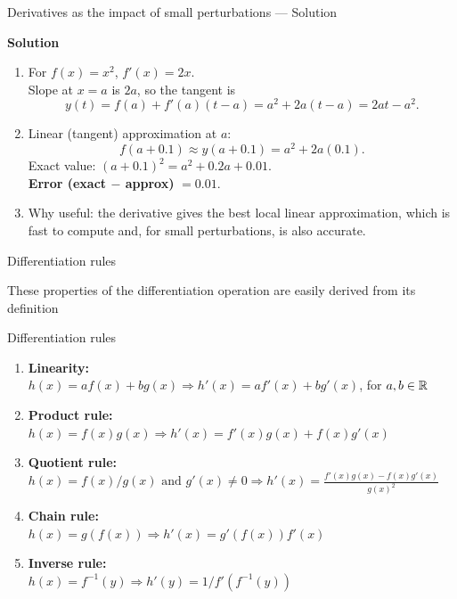 \documentclass[9pt]{beamer}
\begin{document}
\begin{frame}{Derivatives as the impact of small perturbations — Solution}

\textbf{Solution}
\begin{enumerate}[leftmargin=0.8cm, label=(\alph*), rightmargin=0.2cm]

\item For $f(x)=x^2$, $f'(x)=2x$. \\
Slope at $x=a$ is $2a$, so the tangent is
\[
y(t) = f(a)+f'(a)(t-a)=a^2+2a(t-a)=2at-a^2.
\]

\item Linear (tangent) approximation at $a$:
\[
f(a+0.1)\approx y(a+0.1) = a^2+2a(0.1).
\]
Exact value: $(a+0.1)^2=a^2+0.2a+0.01$. \\
\textbf{Error (exact $-$ approx)} $=0.01$.

\item Why useful: the derivative gives the best local linear approximation, 
which is fast to compute and, for small perturbations, is also accurate.

\end{enumerate}

\end{frame}


\begin{frame}{Differentiation rules}

    These properties of the differentiation operation are easily derived from its definition
    \begin{block}{Differentiation rules}
        
        \begin{enumerate}[leftmargin = 0.5cm, label = $\bullet$, rightmargin = 0.2cm]

        \item \textbf{Linearity:} \\
        $h(x) = a f(x) + b g(x) \Longrightarrow h'(x) = a f'(x) + b g'(x)$, for $a, b \in\mathbb{R}$

        \item \textbf{Product rule:} \\
        $h(x) = f(x)g(x) \Longrightarrow h'(x) = f'(x)g(x) + f(x)g'(x)$

        \item \textbf{Quotient rule:} \\ 
        $h(x) = f(x)/g(x) \text{ and } g'(x) \neq 0 \Longrightarrow h'(x) = \frac{f'(x)g(x) - f(x)g'(x)}{g(x)^2}$

        \item \textbf{Chain rule:} \\
        $h(x) = g(f(x)) \Longrightarrow h'(x) = g'(f(x))f'(x)$

        \item \textbf{Inverse rule:} \\
        $h(x) = f^{-1}(y) \Longrightarrow h'(y) = 1/f'(f^{-1}(y))$
        
        \end{enumerate}
        
    \end{block}
    
\end{frame}
\end{document}
